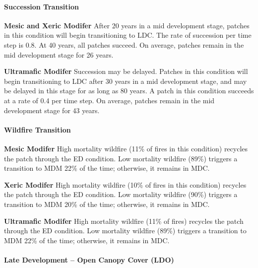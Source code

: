 \paragraph{Succession Transition}
\begin{adjustwidth}{2cm}{}
\textbf{Mesic and Xeric Modifer } After 20 years in a mid development stage, patches in this condition will begin transitioning to LDC. The rate of succession per time step is 0.8. At 40 years, all patches succeed. On average, patches remain in the mid development stage for 26 years.

\medskip
\noindent \textbf{Ultramafic Modifer} Succession may be delayed. Patches in this condition will begin transitioning to LDC after 30 years in a mid development stage, and may be delayed in this stage for as long as 80 years. A patch in this condition succeeds at a rate of 0.4 per time step. On average, patches remain in the mid development stage for 43 years.

\end{adjustwidth}
\paragraph{Wildfire Transition}
\begin{adjustwidth}{2cm}{}
\textbf{Mesic Modifer } High mortality wildfire (11\% of fires in this condition) recycles the patch through the ED condition. Low mortality wildfire (89\%) triggers a transition to MDM 22\% of the time; otherwise, it remains in MDC.

\medskip
\noindent \textbf{Xeric Modifer} High mortality wildfire (10\% of fires in this condition) recycles the patch through the ED condition. Low mortality wildfire (90\%) triggers a transition to MDM 20\% of the time; otherwise, it remains in MDC.

\medskip
\noindent \textbf{Ultramafic Modifer} High mortality wildfire (11\% of fires) recycles the patch through the ED condition. Low mortality wildfire (89\%) triggers a transition to MDM 22\% of the time; otherwise, it remains in MDC.

\end{adjustwidth}
\noindent\hrulefill


\paragraph{Late Development – Open Canopy Cover (LDO)}

